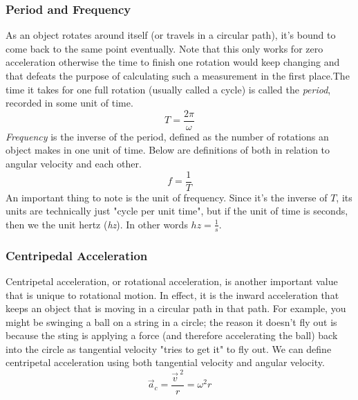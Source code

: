 \subsubsection{Period and Frequency}
As an object rotates around itself (or travels in a circular path), it's bound to come back to the same point eventually. Note that this only works for 
zero acceleration otherwise the time to finish one rotation would keep changing and that defeats the purpose of calculating such a measurement in the 
first place.The time it takes for one full rotation (usually called a cycle) is called the \textit{period}, recorded in some unit of time. 
\begin{equation}
    T = \frac{2 \pi}{\omega}
\end{equation}
\noindent \textit{Frequency} is the inverse of the period, defined as the number of rotations an object makes in one unit of time. Below are 
definitions of both in relation to angular velocity and each other.
\begin{equation}
    f = \frac{1}{T}
\end{equation}
An important thing to note is the unit of frequency. Since it's the inverse of $T$, its units are technically just "cycle per unit time", but if the 
unit of time is seconds, then we the unit hertz (\textit{hz}). In other words $hz = \frac{1}{s}$.

\subsubsection{Centripedal Acceleration}
Centripetal acceleration, or rotational acceleration, is another important value that is unique to rotational motion. In effect, it is the inward 
acceleration that keeps an object that is moving in a circular path in that path. For example, you might be swinging a ball on a string in a circle; 
the reason it doesn't fly out is because the sting is applying a force (and therefore accelerating the ball) back into the circle as tangential 
velocity "tries to get it" to fly out. We can define centripetal acceleration using both tangential velocity and angular velocity.
\begin{equation}
    \vec{a}_c = \frac{\vec{v}^{\: 2}}{r} = \omega^2 r
\end{equation}
